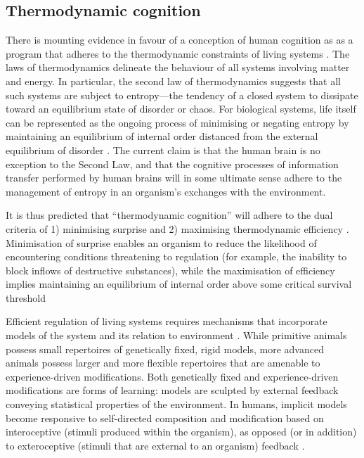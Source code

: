 \begin{CJK}{UTF8}{gbsn}
\subsection{Thermodynamic cognition}
There is mounting evidence in favour of a conception of human cognition as as a program that adheres to the thermodynamic constraints of living systems \citep{Carhart-Harris2014,Yufik2017}.  The laws of thermodynamics delineate the behaviour of all systems involving matter and energy.  In particular, the second law of thermodynamics suggests that all such systems are subject to entropy---the tendency of a closed system to dissipate toward an equilibrium state of disorder or chaos.  For biological systems, life itself can be represented as the ongoing process of minimising or negating entropy by maintaining an equilibrium of internal order distanced from the external equilibrium of disorder \citep{Schrödinger1944}.  The current claim is that the human brain is no exception to the Second Law, and that the cognitive processes of information transfer performed by human brains will in some ultimate sense adhere to the management of entropy in an organism's exchanges with the environment.

It is thus predicted that ``thermodynamic cognition'' will adhere to the dual criteria of 1) minimising surprise \citep{Friston2010,Sengupta2013,Sengupta2016,Sengupta2017} and 2) maximising thermodynamic efficiency \citep{Yufik2002,Yufik2013}.   Minimisation of surprise enables an organism to reduce the likelihood of encountering conditions threatening to regulation (for example, the inability to block inflows of destructive substances), while the maximisation of efficiency implies maintaining an equilibrium of internal order above some critical survival threshold

Efficient regulation of living systems requires mechanisms that incorporate models of the system and its relation to environment \citep{Conant1970}.  While primitive animals possess small repertoires of genetically fixed, rigid models, more advanced animals possess larger and more flexible repertoires that are amenable to experience-driven modifications.  Both genetically fixed and experience-driven modifications are forms of learning: models are sculpted by external feedback conveying statistical properties of the environment.  In humans, implicit models become responsive to self-directed composition and modification based on interoceptive (stimuli produced within the organism), as opposed (or in addition) to exteroceptive (stimuli that are external to an organism) feedback \citep{Yufik1998}.


\end{CJK}
